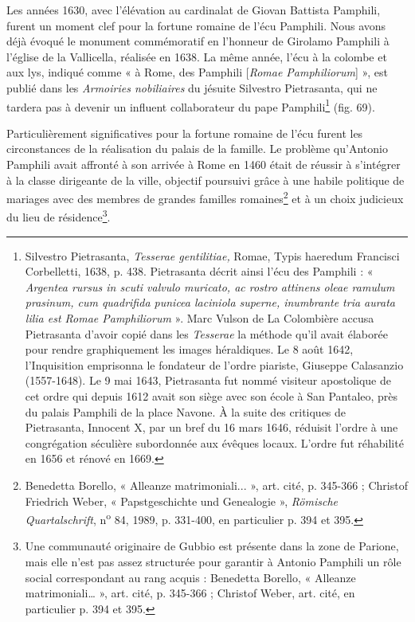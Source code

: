 \documentclass[12pt,twoside,openany]{book}
\begin{document}
Les années 1630, avec l’élévation au cardinalat de Giovan Battista Pamphili, furent un moment clef pour la fortune romaine de l’écu Pamphili. Nous avons déjà évoqué le monument commémoratif en l’honneur de Girolamo Pamphili à l’église de la Vallicella, réalisée en 1638. La même année, l’écu à la colombe et aux lys, indiqué comme « à Rome, des Pamphili [\textit{Romae Pamphiliorum}] », est publié dans les \textit{Armoiries nobiliaires} du jésuite Silvestro Pietrasanta, qui ne tardera pas à devenir un influent collaborateur du pape Pamphili\footnote{Silvestro Pietrasanta, \textit{Tesserae gentilitiae,} Romae, Typis haeredum Francisci Corbelletti, 1638, p. 438. Pietrasanta décrit ainsi l’écu des Pamphili : « \textit{Argentea rursus in scuti valvulo muricato, ac rostro attinens oleae ramulum prasinum, cum quadrifida punicea laciniola superne, inumbrante tria aurata lilia est Romae Pamphiliorum} ». Marc Vulson de La Colombière accusa Pietrasanta d’avoir copié dans les \textit{Tesserae} la méthode qu’il avait élaborée pour rendre graphiquement les images héraldiques. Le 8 août 1642, l’Inquisition emprisonna le fondateur de l’ordre piariste, Giuseppe Calasanzio (1557-1648). Le 9 mai 1643, Pietrasanta fut nommé visiteur apostolique de cet ordre qui depuis 1612 avait son siège avec son école à San Pantaleo, près du palais Pamphili de la place Navone. À la suite des critiques de Pietrasanta, Innocent X, par un bref du 16 mars 1646, réduisit l’ordre à une congrégation séculière subordonnée aux évêques locaux. L’ordre fut réhabilité en 1656 et rénové en 1669.} (fig. 69).

Particulièrement significatives pour la fortune romaine de l’écu furent les circonstances de la réalisation du palais de la famille. Le problème qu’Antonio Pamphili avait affronté à son arrivée à Rome en 1460 était de réussir à s’intégrer à la classe dirigeante de la ville, objectif poursuivi grâce à une habile politique de mariages avec des membres de grandes familles romaines\footnote{Benedetta Borello, « Alleanze matrimoniali... », art. cité, p. 345-366 ; Christof Friedrich Weber, « Papstgeschichte und Genealogie », \textit{Römische Quartalschrift}, n\textsuperscript{o} 84, 1989, p. 331-400, en particulier p. 394 et 395.} et à un choix judicieux du lieu de résidence\footnote{Une communauté originaire de Gubbio est présente dans la zone de Parione, mais elle n’est pas assez structurée pour garantir à Antonio Pamphili un rôle social correspondant au rang acquis : Benedetta Borello, « Alleanze matrimoniali… », art. cité, p. 345-366 ; Christof Weber, art. cité, en particulier p. 394 et 395.}.
\end{document}
